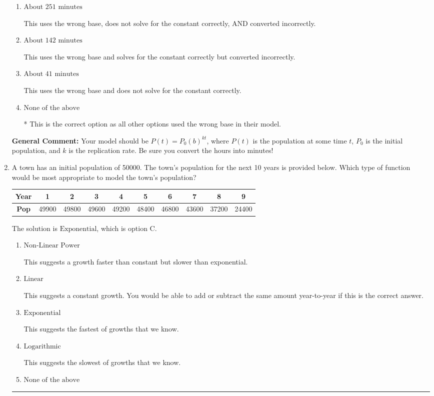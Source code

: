 \documentclass{extbook}[14pt]
\newcommand{\litem}[1]{\item #1

\rule{\textwidth}{0.4pt}}
\begin{document}
\begin{enumerate}
{\begin{enumerate}[label=\Alph*.]
This uses the wrong base.
\item \( \text{About } 251 \text{ minutes} \)

This uses the wrong base, does not solve for the constant correctly, AND converted incorrectly.
\item \( \text{About } 142 \text{ minutes} \)

This uses the wrong base and solves for the constant correctly but converted incorrectly.
\item \( \text{About } 41 \text{ minutes} \)

This uses the wrong base and does not solve for the constant correctly.
\item \( \text{None of the above} \)

* This is the correct option as all other options used the wrong base in their model.
\end{enumerate}

\textbf{General Comment:} Your model should be $P(t) = P_0(b)^{kt}$, where $P(t)$ is the population at some time $t$, $P_0$ is the initial population, and $k$ is the replication rate. Be sure you convert the hours into minutes!
}
\litem{
A town has an initial population of 50000. The town's population for the next 10 years is provided below. Which type of function would be most appropriate to model the town's population?


\begin{tabular}{c|c|c|c|c|c|c|c|c|c}
\textbf{Year} &1 &2 &3 &4 &5 &6 &7 &8 &9\tabularnewline \hline
\textbf{Pop} &49900 &49800 &49600 &49200 &48400 &46800 &43600 &37200 &24400\end{tabular}The solution is \( \text{Exponential} \), which is option C.\begin{enumerate}[label=\Alph*.]
\item \( \text{Non-Linear Power} \)

This suggests a growth faster than constant but slower than exponential.
\item \( \text{Linear} \)

This suggests a constant growth. You would be able to add or subtract the same amount year-to-year if this is the correct answer.
\item \( \text{Exponential} \)

This suggests the fastest of growths that we know.
\item \( \text{Logarithmic} \)

This suggests the slowest of growths that we know.
\item \( \text{None of the above} \)


\end{enumerate}}
\end{enumerate}
\end{document}
